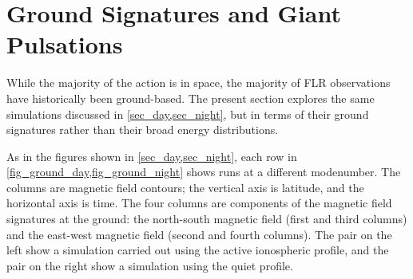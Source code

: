 



\section{Ground Signatures and Giant Pulsations}
  \label{sec_ground}

While the majority of the action is in space, the majority of FLR observations have historically been ground-based. The present section explores the same simulations discussed in \cref{sec_day,sec_night}, but in terms of their ground signatures rather than their broad energy distributions. 

As in the figures shown in \cref{sec_day,sec_night}, each row in \cref{fig_ground_day,fig_ground_night} shows runs at a different modenumber. The columns are magnetic field contours; the vertical axis is latitude, and the horizontal axis is time. The four columns are components of the magnetic field signatures at the ground:  the north-south magnetic field (first and third columns) and the east-west magnetic field (second and fourth columns). The pair on the left show a simulation carried out using the active ionospheric profile, and the pair on the right show a simulation using the quiet profile. 

